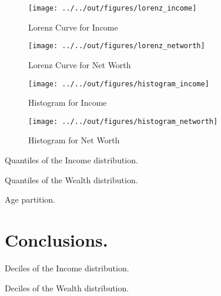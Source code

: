 \documentclass[11pt, a4paper, leqno]{article}
\begin{document}
\begin{figure}
    \caption{Lorenz Curve for Income}
    
    \texttt{[image: ../../out/figures/lorenz\_income]}
    \label{fig:lorincome}
\end{figure}


\begin{figure}
    \caption{Lorenz Curve for Net Worth}
    
    \texttt{[image: ../../out/figures/lorenz\_networth]}
    \label{fig:lornetworth}

\end{figure}

\begin{figure}
    \caption{Histogram for Income}
    
    \texttt{[image: ../../out/figures/histogram\_income]}
    \label{fig:histincome}
\end{figure}

\begin{figure}
    \caption{Histogram for Net Worth}
    
    \texttt{[image: ../../out/figures/histogram\_networth]}
    \label{fig:histnetworth}
\end{figure}

\begin{table}
    \caption{Quantiles of the Income distribution.}
    \resizebox{\textwidth}{!}{}
    \label{tab:quintilesincome}
\end{table}


\begin{table}
    \caption{Quantiles of the Wealth distribution.}
    \resizebox{\textwidth}{!}{}
    \label{tab:quintilesnetworth}
\end{table}

\begin{table}
    \caption{Age partition.}
    \resizebox{\textwidth}{!}{}
    \label{tab:agepartition}
\end{table}

\section{Conclusions.}









\begin{table}
    \caption{Deciles of the Income distribution.}
    \resizebox{\textwidth}{!}{}
\end{table}

\begin{table}
    \caption{Deciles of the Wealth distribution.}
    \resizebox{\textwidth}{!}{}
\end{table}

\end{document}
